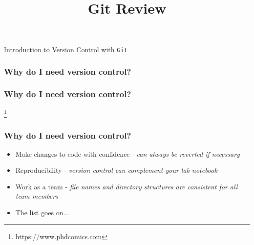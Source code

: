 \documentclass{beamer}
\title{Git Review}
\begin{document}
\begin{frame}
\begin{center}
Introduction to Version Control with \texttt{Git}
\end{center}
\end{frame}

\begin{frame}
\frametitle{Why do I need version control?}
\end{frame}


\begin{frame}
\frametitle{Why do I need version control?}
\begin{center}
\end{center}
\footnote{\footnotesize{https://www.phdcomics.com}}
\end{frame}

\begin{frame}
\frametitle{Why do I need version control?}
\begin{itemize}
\item Make changes to code with confidence - \textit{can always be reverted if necessary} \pause
\item Reproducibility -  \textit{version control can complement your lab notebook} \pause
\item Work as a team -  \textit{file names and directory structures are consistent for all team members} \pause
\item The list goes on...
\end{itemize}
\end{frame}
\end{document}
